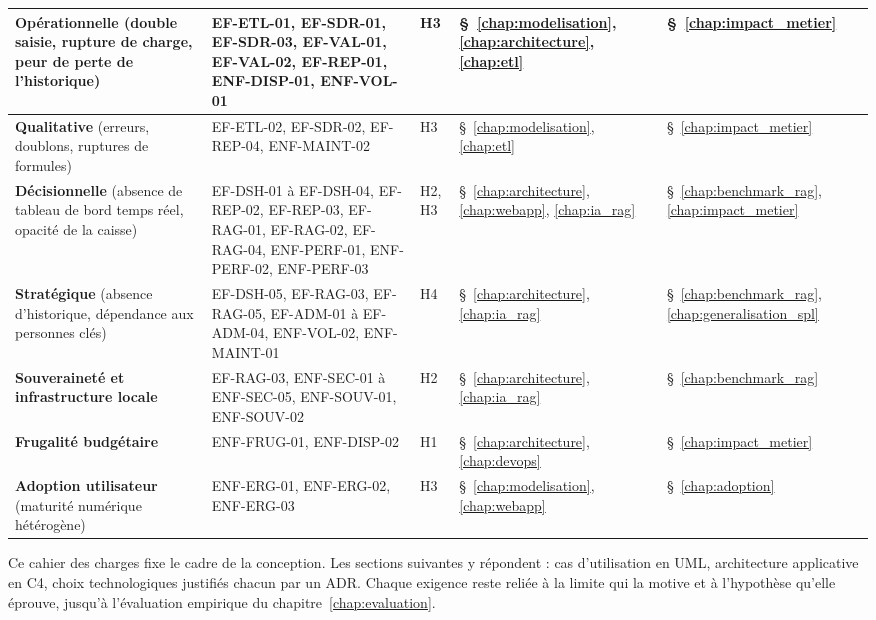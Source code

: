 \begin{longtable}{|>{\raggedright\arraybackslash}p{2.9cm}|>{\raggedright\arraybackslash}p{4.7cm}|>{\centering\arraybackslash}p{1.2cm}|>{\centering\arraybackslash}p{2.0cm}|>{\centering\arraybackslash}p{1.9cm}|}
\textbf{Opérationnelle} (double saisie, rupture de charge, peur de perte de l'historique) & EF-ETL-01, EF-SDR-01, EF-SDR-03, EF-VAL-01, EF-VAL-02, EF-REP-01, ENF-DISP-01, ENF-VOL-01 & H3 & §~\ref{chap:modelisation}, \ref{chap:architecture}, \ref{chap:etl} & §~\ref{chap:impact_metier} \\ \hline
\textbf{Qualitative} (erreurs, doublons, ruptures de formules) & EF-ETL-02, EF-SDR-02, EF-REP-04, ENF-MAINT-02 & H3 & §~\ref{chap:modelisation}, \ref{chap:etl} & §~\ref{chap:impact_metier} \\ \hline
\textbf{Décisionnelle} (absence de tableau de bord temps réel, opacité de la caisse) & EF-DSH-01 à EF-DSH-04, EF-REP-02, EF-REP-03, EF-RAG-01, EF-RAG-02, EF-RAG-04, ENF-PERF-01, ENF-PERF-02, ENF-PERF-03 & H2, H3 & §~\ref{chap:architecture}, \ref{chap:webapp}, \ref{chap:ia_rag} & §~\ref{chap:benchmark_rag}, \ref{chap:impact_metier} \\ \hline
\textbf{Stratégique} (absence d'historique, dépendance aux personnes clés) & EF-DSH-05, EF-RAG-03, EF-RAG-05, EF-ADM-01 à EF-ADM-04, ENF-VOL-02, ENF-MAINT-01 & H4 & §~\ref{chap:architecture}, \ref{chap:ia_rag} & §~\ref{chap:benchmark_rag}, \ref{chap:generalisation_spl} \\ \hline
\textbf{Souveraineté et infrastructure locale} & EF-RAG-03, ENF-SEC-01 à ENF-SEC-05, ENF-SOUV-01, ENF-SOUV-02 & H2 & §~\ref{chap:architecture}, \ref{chap:ia_rag} & §~\ref{chap:benchmark_rag} \\ \hline
\textbf{Frugalité budgétaire} & ENF-FRUG-01, ENF-DISP-02 & H1 & §~\ref{chap:architecture}, \ref{chap:devops} & §~\ref{chap:impact_metier} \\ \hline
\textbf{Adoption utilisateur} (maturité numérique hétérogène) & ENF-ERG-01, ENF-ERG-02, ENF-ERG-03 & H3 & §~\ref{chap:modelisation}, \ref{chap:webapp} & §~\ref{chap:adoption} \\ \hline
\end{longtable}

Ce cahier des charges fixe le cadre de la conception. Les sections suivantes y répondent : cas d'utilisation en UML, architecture applicative en C4, choix technologiques justifiés chacun par un ADR. Chaque exigence reste reliée à la limite qui la motive et à l'hypothèse qu'elle éprouve, jusqu'à l'évaluation empirique du chapitre~\ref{chap:evaluation}.